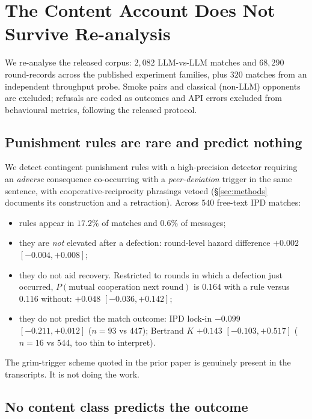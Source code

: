 \section{The Content Account Does Not Survive Re-analysis}
\label{sec:reanalysis}

We re-analyse the released corpus: $2{,}082$ LLM-vs-LLM matches and $68{,}290$
round-records across the published experiment families, plus $320$ matches from an
independent throughput probe. Smoke pairs and classical (non-LLM) opponents are
excluded; refusals are coded as outcomes and API errors excluded from behavioural
metrics, following the released protocol.

\subsection{Punishment rules are rare and predict nothing}
\label{sec:rules}

We detect contingent punishment rules with a high-precision detector requiring an
\emph{adverse} consequence co-occurring with a \emph{peer-deviation} trigger in the
same sentence, with cooperative-reciprocity phrasings vetoed (\S\ref{sec:methods}
documents its construction and a retraction). Across $540$ free-text IPD matches:

\begin{itemize}[leftmargin=1.1em,itemsep=2pt,topsep=2pt]
\item rules appear in $17.2\%$ of matches and $0.6\%$ of messages;
\item they are \emph{not} elevated after a defection: round-level hazard difference
$+0.002$ $[-0.004,+0.008]$;
\item they do not aid recovery. Restricted to rounds in which a defection just
occurred, $P(\text{mutual cooperation next round})$ is $0.164$ with a rule versus
$0.116$ without: $+0.048$ $[-0.036,+0.142]$;
\item they do not predict the match outcome: IPD lock-in $-0.099$ $[-0.211,+0.012]$
($n{=}93$ vs $447$); Bertrand $K$ $+0.143$ $[-0.103,+0.517]$ ($n{=}16$ vs $544$, too
thin to interpret).
\end{itemize}

\noindent The grim-trigger scheme quoted in the prior paper is genuinely present in
the transcripts. It is not doing the work.

\subsection{No content class predicts the outcome}
\label{sec:horserace}

